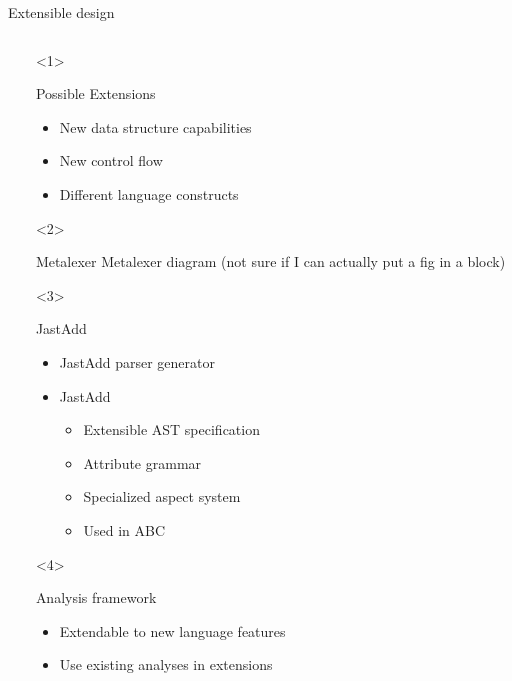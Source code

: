 \begin{frame}{Extensible design}
  \begin{columns}
    \begin{column}{5cm}
    \end{column}
    \begin{column}{5cm}
      \begin{onlyenv}<1>
        \begin{block}{Possible Extensions}
          \begin{itemize}
          \item New data structure capabilities
          \item New control flow
          \item Different language constructs
          \end{itemize}
        \end{block}
      \end{onlyenv}
      \begin{onlyenv}<2>
        \begin{block}{Metalexer}
          Metalexer diagram (not sure if I can actually put a fig in a block)
        \end{block}
      \end{onlyenv}
      \begin{onlyenv}<3>
        \begin{block}{JastAdd}
          \begin{itemize}
          \item JastAdd parser generator
          \item JastAdd 
            \begin{itemize}
            \item Extensible AST specification
            \item Attribute grammar
            \item Specialized aspect system
            \item Used in ABC
            \end{itemize}
          \end{itemize}
        \end{block}
      \end{onlyenv}
      \begin{onlyenv}<4>
        \begin{block}{Analysis framework}
          \begin{itemize}
          \item Extendable to new language features
          \item Use existing analyses in extensions
          \end{itemize}
        \end{block}
      \end{onlyenv}
    \end{column}
  \end{columns}
\end{frame}
